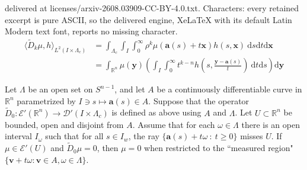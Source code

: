 \documentclass[10pt,a4paper]{amsart}
\newcommand{\va}{\mathbf{a}}
\newcommand{\vv}{{\mathbf{v}}}
\newcommand{\vx}{{\mathbf{x}}}
\newcommand{\vy}{{\mathbf{y}}}
\begin{document}
delivered at licenses/arxiv-2608.03909-CC-BY-4.0.txt. Characters: every retained excerpt is pure ASCII, so the delivered engine, XeLaTeX with its default Latin Modern text font, reports no missing character.
\begin{equation}\label{eq:Dkdef2}
\begin{split}
\langle \widetilde{D}_k \mu, h \rangle_{L^2(I \times \Lambda_c)} & = \int_{\Lambda_c} \int_I \int_0^\infty \rho^{k} \mu(\va(s) + t \vx) h(s,\vx) \ \mathrm{d}s \mathrm{d}t \mathrm{d}\vx \\
& = \int_{\mathbb{R}^n} \mu(\vy)\left ( \int_I \int_0^\infty t^{k-n} h\left ( s, \frac{\vy-\va(s)}{t} \right )\ \mathrm{d}t \mathrm{d}s\right ) \mathrm{d}\vy
\end{split}
\end{equation}

\begin{theorem}
\label{natt}
Let $\Lambda$ be an open set on $S^{n-1}$, and let $A$ be a continuously
differentiable curve in $\mathbb{R}^n$ parametrized by $I \ni s \mapsto \va(s) \in A$. Suppose that the operator $\widetilde{D}_0: \mathcal{E}'(\mathbb{R}^n)\rightarrow \mathcal{D}'(I \times \Lambda_c)$ is defined as above using $A$ and $\Lambda$. Let $U \subset \mathbb{R}^n$ be bounded, open and disjoint from $A$. Assume that for each $\omega \in \Lambda$
there is an open interval $I_\omega$ such that for all $s \in I_w$, the ray $\{\va(s) + t\omega \ :\ t\geq 0\}$ misses $U$. If $\mu \in \mathcal{E}'(U)$ and
$\widetilde{D}_0\mu=0$, then $\mu = 0$ when restricted to the ``measured region"
$\{\vv+t\omega : \vv\in A, \omega \in \Lambda\}$.
\end{theorem}
\end{document}
